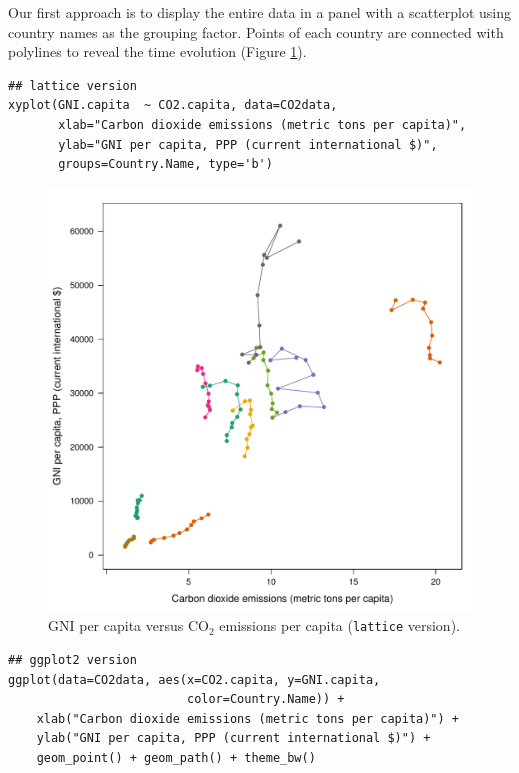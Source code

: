 \documentclass[smallroyalvopaper]{memoir}
\begin{document}

Our first approach is to display the entire data in a panel with a
scatterplot using country names as the grouping factor. Points of each
country are connected with polylines to reveal the time evolution
(Figure \ref{fig:CO2-GNI}).
\lstset{language=r,label= ,caption= ,captionpos=b,numbers=none}
\begin{lstlisting}
## lattice version
xyplot(GNI.capita  ~ CO2.capita, data=CO2data,
       xlab="Carbon dioxide emissions (metric tons per capita)",
       ylab="GNI per capita, PPP (current international $)",
       groups=Country.Name, type='b')
\end{lstlisting}

\begin{figure}[htbp]
\centering
\includegraphics[width=.9\linewidth]{figs/CO2_GNI.pdf}
\caption{GNI per capita versus \(\mathrm{CO_2}\) emissions per capita (\texttt{lattice} version). \label{fig:CO2-GNI}}
\end{figure}

\lstset{language=r,label= ,caption= ,captionpos=b,numbers=none}
\begin{lstlisting}
## ggplot2 version
ggplot(data=CO2data, aes(x=CO2.capita, y=GNI.capita,
                         color=Country.Name)) +
    xlab("Carbon dioxide emissions (metric tons per capita)") +
    ylab("GNI per capita, PPP (current international $)") +
    geom_point() + geom_path() + theme_bw()
\end{lstlisting}
\end{document}
